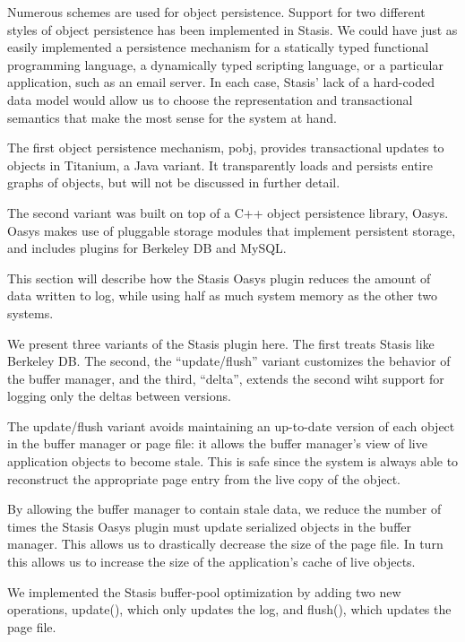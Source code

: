 \documentclass[letterpaper,twocolumn,10pt]{article}
\newcommand{\yad}{Stasis\xspace}
\newcommand{\yads}{Stasis'\xspace}
\newcommand{\oasys}{Oasys\xspace}
\begin{document}
Numerous schemes are used for object persistence.  Support for two
different styles of object persistence has been implemented in
\yad.  We could have just as easily implemented a persistence
mechanism for a statically typed functional programming language, a
dynamically typed scripting language, or a particular application,
such as an email server.  In each case, \yads lack of a hard-coded data
model would allow us to choose the representation and transactional
semantics that make the most sense for the system at hand.

The first object persistence mechanism, pobj, provides transactional updates to objects in
Titanium, a Java variant.  It transparently loads and persists
entire graphs of objects, but will not be discussed in further detail.

The second variant was built on top of a C++ object
persistence library, \oasys.  \oasys makes use of pluggable storage
modules that implement persistent storage, and includes plugins
for Berkeley DB and MySQL.  

This section will describe how the \yad \oasys plugin reduces the
amount of data written to log, while using half as much system memory
as the other two systems.

We present three variants of the \yad plugin here.  The first treats
\yad like Berkeley DB.  The second, the ``update/flush'' variant
customizes the behavior of the buffer manager, and the third,
``delta'', extends the second wiht support for logging only the deltas
between versions.

The update/flush variant avoids maintaining an up-to-date
version of each object in the buffer manager or page file: it allows
the buffer manager's view of live application objects to become stale.
This is safe since the system is always able to reconstruct the
appropriate page entry from the live copy of the object.

By allowing the buffer manager to contain stale data, we reduce the
number of times the \yad \oasys plugin must update serialized objects in the buffer manager.
This allows us to drastically decrease the
size of the page file.  In turn this allows us to increase the size of
the application's cache of live objects.

We implemented the \yad buffer-pool optimization by adding two new
operations, update(), which only updates the log, and flush(), which
updates the page file.  
\end{document}
